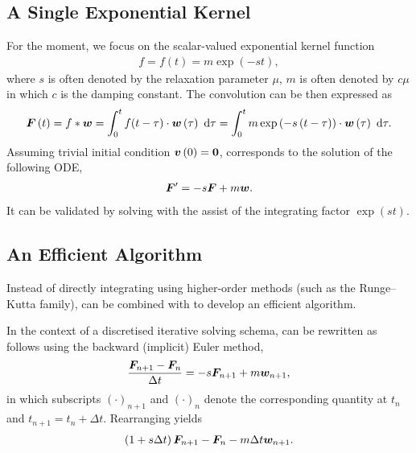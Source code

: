 \subsection{A Single Exponential Kernel}
For the moment, we focus on the scalar-valued exponential kernel function
\begin{gather}
f=f\left(t\right)=m\exp\left(-st\right),
\end{gather}
where $s$ is often denoted by the relaxation parameter $\mu$, $m$ is often denoted by $c\mu$ in which $c$ is the damping constant.
The convolution can be then expressed as
\begin{gather}\label{eq:single_conv}
\bm{F}\left(t\right)=f*\bm{w}=\int_0^tf(t-\tau)\cdot\bm{w}\left(\tau\right)~\mathrm{d}\tau=\int_0^tm\exp\left(-s\left(t-\tau\right)\right)\cdot\bm{w}\left(\tau\right)~\mathrm{d}\tau.
\end{gather}
Assuming trivial initial condition $\bm{v}\left(0\right)=\bm{0}$,  corresponds to the solution of the following ODE,
\begin{gather}\label{eq:single_conv_ode}
\bm{F}'=-s\bm{F}+m\bm{w}.
\end{gather}
It can be validated by solving  with the assist of the integrating factor $\exp\left(st\right)$.
\subsection{An Efficient Algorithm}
Instead of directly integrating  using higher-order methods (such as the Runge--Kutta family),  can be combined with  to develop an efficient algorithm.

In the context of a discretised iterative solving schema,  can be rewritten as follows using the backward (implicit) Euler method,
\begin{gather}\label{eq:discretised_a}
\dfrac{\bm{F}_{n+1}-\bm{F}_n}{\Delta{}t}=-s\bm{F}_{n+1}+m\bm{w}_{n+1},
\end{gather}
in which subscripts $\left(\cdot\right)_{n+1}$ and $\left(\cdot\right)_n$ denote the corresponding quantity at $t_n$ and $t_{n+1}=t_n+\Delta{}t$.
Rearranging  yields
\begin{gather}\label{eq:discretised_b}
\left(1+s\Delta{}t\right)\bm{F}_{n+1}-\bm{F}_n-m\Delta{}t\bm{w}_{n+1}.
\end{gather}

